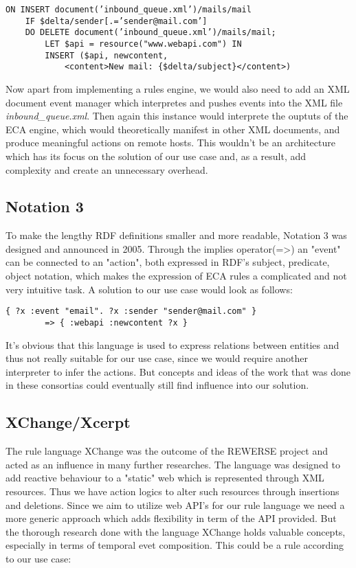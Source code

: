 \begin{lstlisting}[frame=single,float=h,label=lstrdf,language=RDF,caption=E-Mail Example rule expressed in RDF]
	ON INSERT document(’inbound_queue.xml’)/mails/mail
	IF $delta/sender[.=’sender@mail.com’]
	DO DELETE document(’inbound_queue.xml’)/mails/mail;
		LET $api = resource("www.webapi.com") IN
		INSERT ($api, newcontent,
			<content>New mail: {$delta/subject}</content>)
\end{lstlisting}


Now apart from implementing a rules engine, we would also need to add an XML document event manager which interpretes and pushes events into the XML file \emph{inbound\_queue.xml}. Then again this instance would interprete the ouptuts of the ECA engine, which would theoretically manifest in other XML documents, and produce meaningful actions on remote hosts. This wouldn't be an architecture which has its focus on the solution of our use case and, as a result, add complexity and create an unnecessary overhead.

\subsection{Notation 3}
To make the lengthy RDF definitions smaller and more readable, Notation 3\cite{wwwn3} was designed and announced in 2005. Through the implies operator(=\textgreater) an "event" can be connected to an "action", both expressed in RDF's subject, predicate, object notation, which makes the expression of ECA rules a complicated and not very intuitive task. A solution to our use case would look as follows:

\begin{lstlisting}[frame=single,float=h,label=lstn3,language=N3,caption=E-Mail Example rule expressed in Notation 3]
	{ ?x :event "email". ?x :sender "sender@mail.com" }
		=> { :webapi :newcontent ?x }
\end{lstlisting}


It's obvious that this language is used to express relations between entities and thus not really suitable for our use case, since we would require another interpreter to infer the actions. But concepts and ideas of the work that was done in these consortias could eventually still find influence into our solution.

\subsection{XChange/Xcerpt}
The rule language XChange\cite{2005-Patranjan-TLE.pdf} was the outcome of the REWERSE project and acted as an influence in many further researches. The language was designed to add reactive behaviour to a "static" web which is represented through XML resources. Thus we have action logics to alter such resources through insertions and deletions. Since we aim to utilize web API's for our rule language we need a more generic approach which adds flexibility in term of the API provided. But the thorough research done with the language XChange holds valuable concepts, especially in terms of temporal evet composition. This could be a rule according to our use case:

